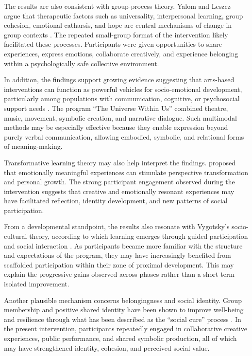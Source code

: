 \documentclass[12pt,a4paper]{article}
\begin{document}
The results are also consistent with group-process theory. Yalom and Leszcz argue that therapeutic factors such as universality, interpersonal learning, group cohesion, emotional catharsis, and hope are central mechanisms of change in group contexts \parencite{yalom2005}. The repeated small-group format of the intervention likely facilitated these processes. Participants were given opportunities to share experiences, express emotions, collaborate creatively, and experience belonging within a psychologically safe collective environment.

In addition, the findings support growing evidence suggesting that arts-based interventions can function as powerful vehicles for socio-emotional development, particularly among populations with communication, cognitive, or psychosocial support needs \parencite{stickley2018,leavy2015}. The program ``The Universe Within Us'' combined theatre, music, movement, symbolic creation, and narrative dialogue. Such multimodal methods may be especially effective because they enable expression beyond purely verbal communication, allowing embodied, symbolic, and relational forms of meaning-making.

Transformative learning theory may also help interpret the findings. \textcite{mezirow2000} proposed that emotionally meaningful experiences can stimulate perspective transformation and personal growth. The strong participant engagement observed during the intervention suggests that creative and emotionally resonant experiences may have facilitated reflection, identity development, and new patterns of social participation.

From a developmental standpoint, the results also resonate with Vygotsky's socio-cultural theory, according to which learning emerges through guided participation and social interaction \parencite{vygotsky1978}. As participants became more familiar with the structure and expectations of the program, they may have increasingly benefited from scaffolded participation within their zone of proximal development. This may explain the progressive gains observed across phases rather than a short-term isolated improvement.

Another plausible mechanism concerns belongingness and social identity. Group membership and positive shared identity have been shown to improve well-being and resilience through what has been described as the ``social cure'' process \parencite{haslam2018}. In the present intervention, participants repeatedly engaged in collaborative creative experiences, public performance, and shared symbolic production, all of which may have strengthened identity, cohesion, and perceived social value.
\end{document}
